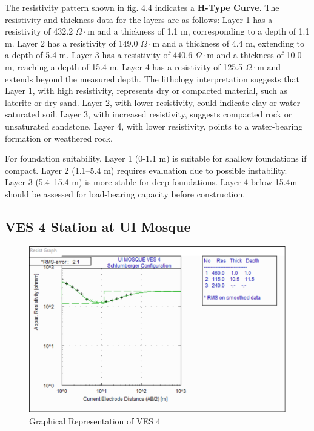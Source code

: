 \documentclass[12pt,a4paper]{report}
\begin{document}
The resistivity pattern shown in fig. 4.4 indicates a \textbf{H-Type Curve}. The resistivity and thickness data for the layers are as follows: Layer 1 has a resistivity of 432.2 $\Omega\cdot$m and a thickness of 1.1 m, corresponding to a depth of 1.1 m. Layer 2 has a resistivity of 149.0 $\Omega\cdot$m and a thickness of 4.4 m, extending to a depth of 5.4 m. Layer 3 has a resistivity of 440.6 $\Omega\cdot$m and a thickness of 10.0 m, reaching a depth of 15.4 m. Layer 4 has a resistivity of 125.5 $\Omega\cdot$m and extends beyond the measured depth. The lithology interpretation suggests that Layer 1, with high resistivity, represents dry or compacted material, such as laterite or dry sand. Layer 2, with lower resistivity, could indicate clay or water-saturated soil. Layer 3, with increased resistivity, suggests compacted rock or unsaturated sandstone. Layer 4, with lower resistivity, points to a water-bearing formation or weathered rock.

For foundation suitability, Layer 1 (0-1.1 m) is suitable for shallow foundations if compact. Layer 2 (1.1--5.4 m) requires evaluation due to possible instability. Layer 3 (5.4--15.4 m) is more stable for deep foundations. Layer 4 below 15.4m should be assessed for load-bearing capacity before construction.

\subsection{VES 4 Station at UI Mosque}

\begin{figure}[H]
    \centering
    \includegraphics[width=1.0\textwidth]{ui_ves4.png}
    \caption{Graphical Representation of VES 4}
    \label{fig:VES_4_Curve}
\end{figure}
\end{document}
